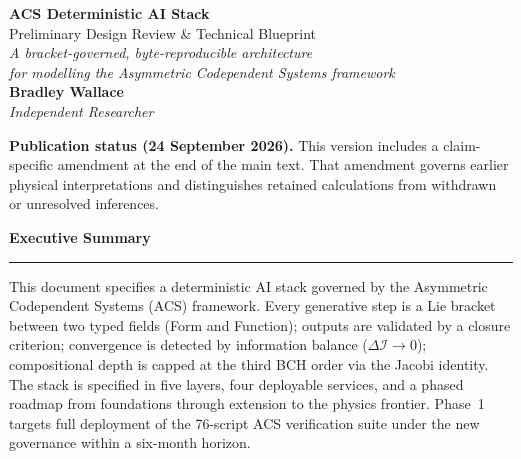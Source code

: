 \documentclass[11pt,a4paper]{article}
\begin{document}
\begin{titlepage}
\thispagestyle{empty}
\noindent{\color{acsrule}\rule{\textwidth}{0.4pt}}
\vspace{6pt}
\vspace{6pt}
\noindent{\color{acsrule}\rule{\textwidth}{0.4pt}}
\vfill
\begin{center}
  {\Huge\bfseries\color{acsprimary} ACS Deterministic AI Stack}\\[0.4em]
  {\Large\color{acsslate} Preliminary Design Review \& Technical Blueprint}\\[1.2em]
  {\normalsize\itshape\color{acsslate}
    A bracket-governed, byte-reproducible architecture\\
    for modelling the Asymmetric Codependent Systems framework}\\[2.0em]
  {\large\bfseries Bradley Wallace}\\[0.25em]
  {\small\itshape\color{acsslate} Independent Researcher}
\end{center}
\par\smallskip\noindent\textbf{Publication status (24 September 2026).}
This version includes a claim-specific amendment at the end of the main text.
That amendment governs earlier physical interpretations and distinguishes
retained calculations from withdrawn or unresolved inferences.\par\smallskip

\vspace{0.4in}
\begin{center}
\begin{minipage}{0.88\textwidth}
\begin{center}
  {\bfseries\color{acsprimary}\large Executive Summary}\\[0.3em]
  {\color{acsrule}\rule{1.2in}{0.3pt}}
\end{center}
\vspace{0.5em}
\small\noindent
This document specifies a deterministic AI stack governed by the
Asymmetric Codependent Systems (ACS) framework. Every generative step
is a Lie bracket between two typed fields (Form and Function); outputs
are validated by a closure criterion; convergence is detected by
information balance ($\Delta\mathcal{I} \to 0$); compositional depth
is capped at the third BCH order via the Jacobi identity. The stack
is specified in five layers, four deployable services, and a phased
roadmap from foundations through extension to the physics frontier.
Phase~1 targets full deployment of the 76-script ACS verification suite
under the new governance within a six-month horizon.
\end{minipage}
\end{center}
\vfill
\noindent{\color{acsrule}\rule{\textwidth}{0.4pt}}
\end{titlepage}
\clearpage
{}
\setcounter{page}{1}
\begingroup\small\tableofcontents\endgroup
\clearpage
{}
\setcounter{page}{1}
\end{document}
